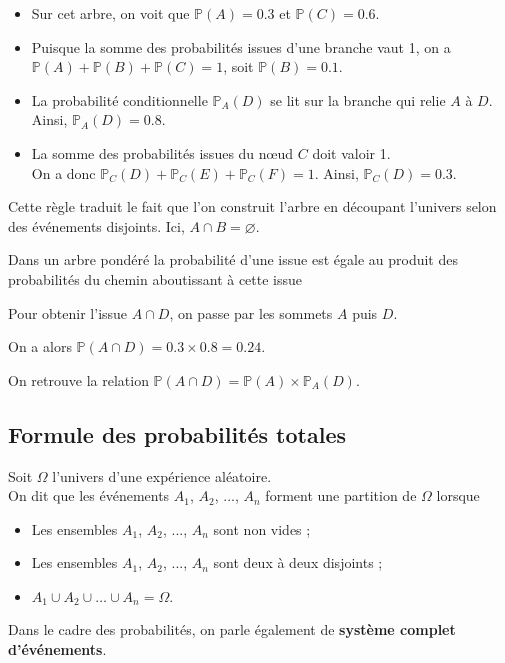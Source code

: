 \documentclass[11pt,fleqn, openany]{book} %
\begin{document}
\begin{example}
\begin{itemize}
\item Sur cet arbre, on voit que $\mathbb{P}(A)=0.3$ et $\mathbb{P}(C)=0.6$.
\item Puisque la somme des probabilités issues d'une branche vaut 1, on a $\mathbb{P}(A)+\mathbb{P}(B)+\mathbb{P}(C)=1$, soit $\mathbb{P}(B)=0.1$.
\item La probabilité conditionnelle $\mathbb{P}_A(D)$ se lit sur la branche qui relie $A$ à $D$. Ainsi, $\mathbb{P}_A(D)=0.8$.
\item La somme des probabilités issues du nœud $C$ doit valoir 1. \\ On a donc $\mathbb{P}_C(D)+\mathbb{P}_C(E)+\mathbb{P}_C(F)=1$. Ainsi, $\mathbb{P}_C(D)=0.3$.
\end{itemize}\end{example}

Cette règle traduit le fait que l'on construit l'arbre en découpant l'univers selon des événements disjoints. Ici, $A\cap B = \varnothing$.

\begin{proposition} Dans un arbre pondéré la probabilité d'une issue est égale au produit des probabilités du chemin aboutissant à cette issue
\end{proposition}

\begin{example}Pour obtenir l'issue $A\cap D$, on passe par les sommets $A$ puis $D$.

On a alors $\mathbb{P}(A\cap D)=0.3 \times 0.8=0.24$.\end{example}

On retrouve la relation $\mathbb{P}(A \cap D)= \mathbb{P}(A) \times \mathbb{P}_A(D)$.
\newpage
\subsection{Formule des probabilités totales}

\begin{definition}[Partition]Soit $\Omega$ l'univers d'une expérience aléatoire. \\On dit que les événements $A_1$, $A_2$, ..., $A_n$ forment une partition de $\Omega$ lorsque
\begin{itemize}
\item Les ensembles $A_1$, $A_2$, ..., $A_n$ sont non vides ;
\item Les ensembles $A_1$, $A_2$, ..., $A_n$ sont deux à deux disjoints ;
\item $A_1\cup A_2\cup \ldots \cup A_n = \Omega$.
\end{itemize}
Dans le cadre des probabilités, on parle également de \textbf{système complet d'événements}.\end{definition}
\end{document}
